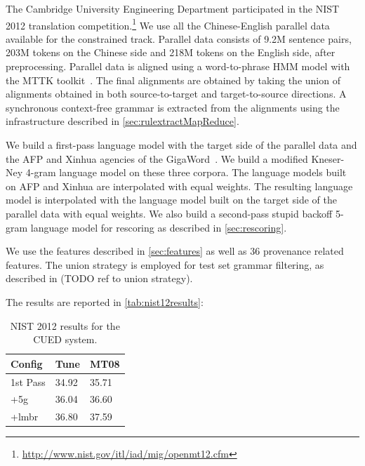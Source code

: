 
The Cambridge University Engineering Department participated in the
NIST 2012 translation
competition.\footnote{\url{http://www.nist.gov/itl/iad/mig/openmt12.cfm}}
We use all the Chinese-English parallel data
available for the constrained track. Parallel data consists
of 9.2M sentence pairs, 203M tokens on the Chinese side and
218M tokens on the English side, after preprocessing.
Parallel data is aligned using a word-to-phrase
HMM model with the MTTK
toolkit~\citep{deng-and-byrne:2008:ASLP}. %
The final alignments are obtained by taking
the union of alignments obtained
in both source-to-target and target-to-source directions.
A synchronous context-free grammar is extracted from
the alignments using the infrastructure described
in \autoref{sec:rulextractMapReduce}.

We build a first-pass language model with the target side
of the parallel data and the AFP and Xinhua agencies of the
GigaWord~\citep{parker-graff-kong-chen-maeda:2009:LDC}. %
We build a modified Kneser-Ney 4-gram language model
on these three corpora. The language models built on AFP
and Xinhua are interpolated with equal weights. The
resulting language model is interpolated with the
language model built on the target side of the parallel
data with equal weights. We also build a second-pass
stupid backoff 5-gram language model for rescoring
as described in \autoref{sec:rescoring}.

We use the features described in \autoref{sec:features}
as well as 36 provenance related features. The union
strategy is employed for test set grammar filtering, as described
in (TODO ref to union strategy).

The results are reported in \autoref{tab:nist12results}:
%
\begin{table}
  \begin{center}
    \begin{tabular}{l|l|l}
      Config   & Tune & MT08 \\
      \hline
      1st Pass & 34.92 & 35.71 \\
      +5g      & 36.04 & 36.60 \\
      +lmbr    & 36.80 & 37.59 \\
    \end{tabular}
    \caption{NIST 2012 results for the CUED system.}
    \label{tab:nist12results}
  \end{center}
\end{table}

